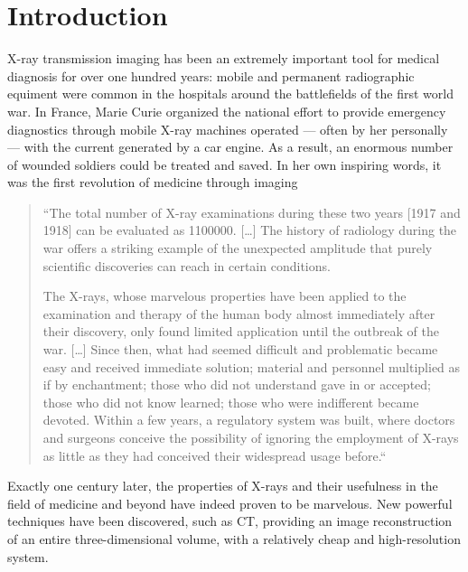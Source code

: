 \chapter{Introduction}\label{ch:introduction}
X-ray transmission imaging has been an extremely important tool for medical
diagnosis for over one hundred years: mobile and permanent radiographic
equiment were common in the hospitals around the battlefields of the first
world war. In France, Marie Curie organized the national effort to
provide emergency diagnostics through mobile X-ray machines operated ---
often by her personally --- with the current generated by a car engine. As a
result, an enormous number of wounded soldiers could be treated and saved.
In her own inspiring words, it was the first revolution of medicine through
imaging
\begin{quote}
    ``The total number of X-ray examinations during these two years [1917 and
    1918] can be evaluated as \num{1100000}. [\ldots]
    The history of radiology during the war offers a striking example of the
    unexpected amplitude that purely scientific discoveries can reach in
    certain conditions.

    The X-rays, whose marvelous properties have been applied to the
    examination and therapy of the human body almost immediately after their
    discovery, only found limited application until the outbreak of the war.
    [\ldots] Since then, what had seemed difficult and problematic became
    easy and received immediate solution; material and personnel
    multiplied as if by enchantment; those who did not understand gave in or
    accepted; those who did not know learned; those who were indifferent
    became devoted. Within a few years, a regulatory system was built, where
    doctors and surgeons conceive the possibility of ignoring the employment of
    X-rays as little as they had conceived their widespread usage
    before.``~\parencite{Curie1921}
\end{quote}

Exactly one century later, the properties of X-rays and their usefulness in
the field of medicine and beyond have indeed proven to be marvelous. 
New powerful techniques have been discovered, such as \ac{CT}, providing an
image reconstruction of an entire three-dimensional volume, with a
relatively cheap and high-resolution system.

